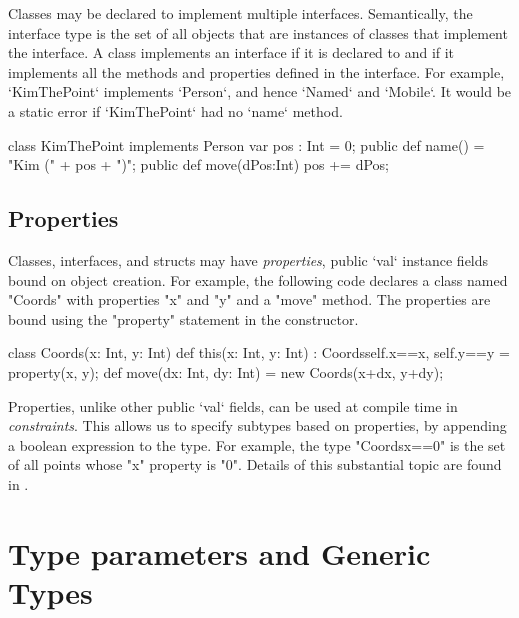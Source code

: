 Classes may be declared to implement multiple interfaces.
Semantically, the interface type is the set of all objects that are
instances of classes that implement the interface. A class implements
an interface if it is declared to and if it implements all the methods
and properties defined in the interface.  For example, \xcd`KimThePoint`
implements \xcd`Person`, and hence \xcd`Named` and \xcd`Mobile`.  It would be
a static error if \xcd`KimThePoint` had no \xcd`name` method.

\begin{xten}
class KimThePoint implements Person {
   var pos : Int = 0;
   public def name() = "Kim (" + pos + ")";
   public def move(dPos:Int) { pos += dPos; }
}
\end{xten}
%


\subsection{Properties}
\label{properties}

Classes, interfaces, and structs may have {\em properties}, public \xcd`val` instance
fields bound on object creation. For example, the following code declares a
class named \xcd"Coords" with properties \xcd"x" and \xcd"y" and a \xcd"move"
method. The properties are bound using the \xcd"property" statement in the
constructor.

\begin{xten}
class Coords(x: Int, y: Int) {
  def this(x: Int, y: Int) : Coords{self.x==x, self.y==y} 
    = { property(x, y); }
  def move(dx: Int, dy: Int) = new Coords(x+dx, y+dy);
}
\end{xten}

Properties, unlike other public \xcd`val` fields, can be used  
at compile time in {\em constraints}. This allows us
to specify subtypes based on properties, by appending a boolean expression to
the type. For example, the type \xcd"Coords{x==0}" is the set of all points
whose \xcd"x" property is \xcd"0".  Details of this substantial topic are
found in .



\section{Type parameters and Generic Types}
\label{TypeParameters}

